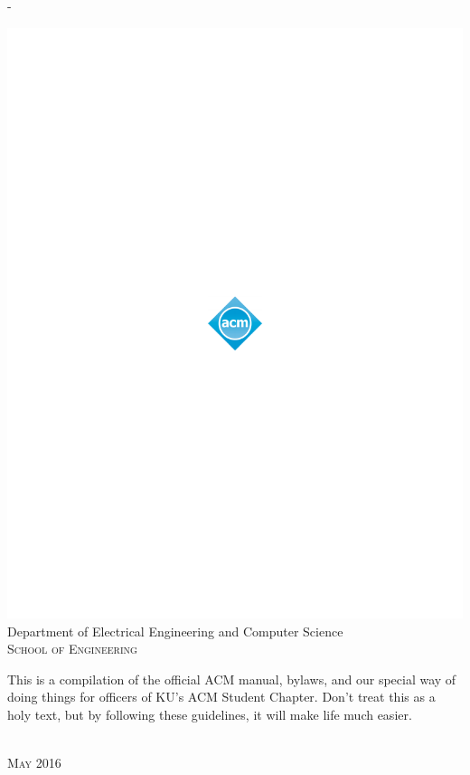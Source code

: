 \begin{titlingpage}
\begin{SingleSpace}
\begin{adjustwidth*}{\unitlength}{-\unitlength}
\begin{center}
\includegraphics[scale=1.8]{logos/acm_sym_1s_grad_pos}\\
\vspace{6mm}
{\large Department of Electrical Engineering and Computer Science\\
\textsc{School of Engineering}}\\
\vspace{11mm}
\begin{minipage}{10cm}
This is a compilation of the official ACM manual, bylaws, and our special way of
doing things for officers of KU's ACM Student Chapter. Don't treat this as a
holy text, but by following these guidelines, it will make life much easier.
\end{minipage}\\
\vspace{9mm}
{\large\textsc{May 2016}}
\vspace{12mm}
\end{center}
\end{adjustwidth*}
\end{SingleSpace}
\end{titlingpage}
